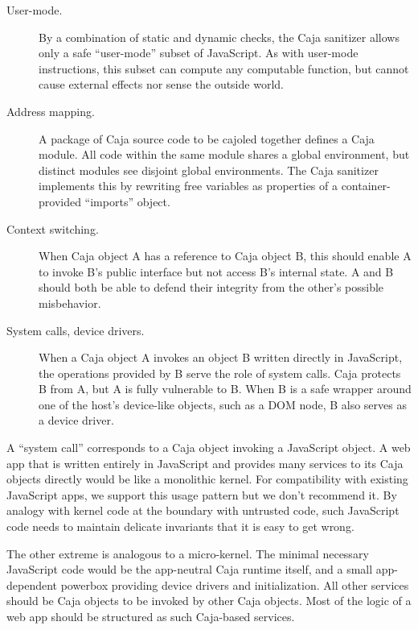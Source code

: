 \documentclass[letterpaper,twocolumn,10pt]{article}
\begin{document}
\begin{description}

  \item[User-mode.] By a combination of static and dynamic checks, the Caja 
  sanitizer allows only a safe ``user-mode'' subset of JavaScript. As with 
  user-mode instructions, this subset can compute any computable function, 
  but cannot cause external effects nor sense the outside world.

  \item[Address mapping.] A package of Caja source code to be cajoled 
  together defines a Caja module. All code within the same module 
  shares a global environment, but distinct modules see disjoint global 
  environments. The Caja sanitizer implements this by
  rewriting free variables as properties of a container-provided 
  ``imports'' object.

  \item[Context switching.] When Caja object A has a reference to Caja 
  object B, this should enable A to invoke B's public interface but not 
  access B's internal state. A and B should both be able to defend their 
  integrity from the other's possible misbehavior.

  \item[System calls, device drivers.] When a Caja object A invokes an 
  object B written directly in JavaScript, the operations provided by B serve 
  the role of system calls. Caja protects B from A, but A is fully 
  vulnerable to B. When B is a safe wrapper around one of the host's 
  device-like objects, such as a DOM node, B also serves as a device driver.

\end{description}

A ``system call'' corresponds to a Caja object invoking a JavaScript object. 
A web app that is written entirely in JavaScript and provides many services 
to its Caja objects directly would be like a monolithic kernel. For 
compatibility with existing JavaScript apps, we support this usage pattern 
but we don't recommend it. By analogy with kernel code at the boundary with 
untrusted code, such JavaScript code needs to maintain delicate invariants 
that it is easy to get wrong.

The other extreme is analogous to a micro-kernel. The minimal necessary 
JavaScript code would be the app-neutral Caja runtime itself, and a small 
app-dependent powerbox providing device drivers and initialization. All other 
services should be Caja objects to be invoked by other Caja objects. Most 
of the logic of a web app should be structured as such Caja-based services.
\end{document}
